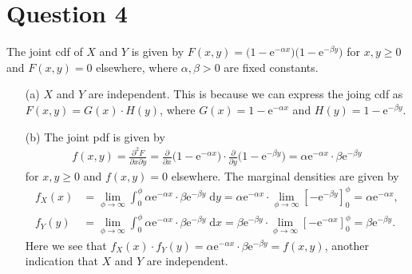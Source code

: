 \documentclass[10pt]{article}
\begin{document}
\section{Question 4} \noindent
The joint cdf of \(X\) and \(Y\) is given by \(F(x,y) = \big( 1 - \mathrm{e}^{-\alpha x} \big) \big( 1 - \mathrm{e}^{-\beta y} \big)\) for \(x,y \ge 0\) and
\(F(x,y) = 0\) elsewhere, where \(\alpha, \beta > 0\) are fixed constants. 
\begin{itemize}
    \item[(a)] \(X\) and \(Y\) are independent. This is because we can express the joing cdf as \(F(x,y) = G(x)\cdot H(y)\), where \(G(x) = 1 - \mathrm{e}^{-\alpha x}\)
    and \(H(y) = 1 - \mathrm{e}^{-\beta y}\). 
    \item[(b)] The joint pdf is given by 
    \begin{align*}
        f(x,y) = \frac{\partial^2 F}{\partial x \partial y} 
        = \frac{\partial}{\partial x}\big( 1 - \mathrm{e}^{-\alpha x} \big) \cdot \frac{\partial}{\partial y}\big( 1 - \mathrm{e}^{-\beta y} \big)
        = \alpha \mathrm{e}^{-\alpha x} \cdot \beta \mathrm{e}^{-\beta y}
    \end{align*}
    for \(x, y \ge 0\) and \(f(x,y) = 0\) elsewhere. The marginal densities are given by 
    \begin{align*}
        f_X(x) 
        &= \lim_{\phi \to \infty}\int_{0}^{\phi} \alpha \mathrm{e}^{-\alpha x} \cdot \beta \mathrm{e}^{-\beta y} \;\mathrm{d}y
        = \alpha \mathrm{e}^{-\alpha x} \cdot \lim_{\phi \to \infty} \left[- \mathrm{e}^{-\beta y} \right]_0^{\phi}
        = \alpha \mathrm{e}^{-\alpha x}, \\
        f_Y(y) 
        &= \lim_{\phi \to \infty}\int_{0}^{\phi} \alpha \mathrm{e}^{-\alpha x} \cdot \beta \mathrm{e}^{-\beta y} \;\mathrm{d}x
        = \beta \mathrm{e}^{-\beta y} \cdot \lim_{\phi \to \infty} \left[- \mathrm{e}^{-\alpha x} \right]_0^{\phi}
        = \beta \mathrm{e}^{-\beta y}.
    \end{align*}
    Here we see that \(f_X(x)\cdot f_Y(y) = \alpha \mathrm{e}^{-\alpha x} \cdot \beta \mathrm{e}^{-\beta y} = f(x,y)\), another indication 
    that \(X\) and \(Y\) are independent. 
\end{itemize}
\end{document}
